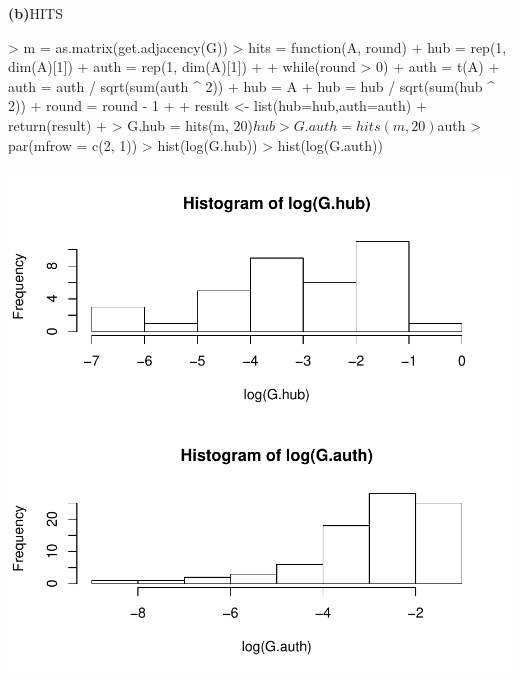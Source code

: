 \documentclass[a4paper]{article}
\renewcommand{\part}[1] {\vspace{.10in} {\bf (#1)}}
\begin{document}
\newpage
\part{b}{HITS}
\begin{Schunk}
\begin{Sinput}
> m = as.matrix(get.adjacency(G))
> hits = function(A, round){
+     hub = rep(1, dim(A)[1])
+     auth = rep(1, dim(A)[1])
+ 
+     while(round > 0) {
+         auth = t(A) %
+         auth = auth / sqrt(sum(auth ^ 2))
+         hub = A %
+         hub = hub / sqrt(sum(hub ^ 2))
+         round = round - 1
+     }
+     result <- list(hub=hub,auth=auth)
+     return(result)
+ }
> G.hub = hits(m, 20)$hub
> G.auth = hits(m, 20)$auth
> par(mfrow = c(2, 1))
> hist(log(G.hub))
> hist(log(G.auth))
\end{Sinput}
\end{Schunk}
\includegraphics{graph-1b}

\newpage
\end{document}

